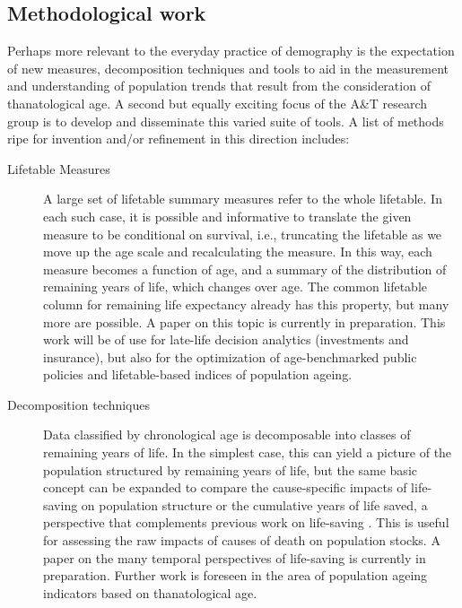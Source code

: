 \documentclass[a4paper,12pt]{article}
\begin{document}
\subsection{Methodological work}
Perhaps more relevant to the everyday practice of demography is the expectation
of new measures, decomposition techniques and tools to aid in the measurement
and understanding of population trends that result from the consideration of
thanatological age. A second but equally exciting focus of the A\&T research
group is to develop and disseminate this varied suite of tools. A list of
methods ripe for invention and/or refinement in this direction includes:

\begin{description}
\item[Lifetable Measures]{A large set of lifetable summary measures refer to
the whole lifetable. In each such case, it is possible and
informative to translate the given measure to be conditional on survival, i.e.,
truncating the lifetable as we move up the age scale and recalculating the
measure. In this way, each measure becomes a function of age, and a summary of
the distribution of remaining years of life, which changes over age. The common
lifetable column for remaining life expectancy already has this property, but
many more are possible. A paper on this topic is currently in preparation.
This work will be of use for late-life decision analytics (investments and
insurance), but also for the optimization of age-benchmarked public policies
and lifetable-based indices of population ageing.}
\item[Decomposition techniques]{Data classified by chronological age is
decomposable into classes of remaining years of life. In the simplest case,
this can yield a picture of the population structured by remaining years of life, but
the same basic concept can be expanded to compare the cause-specific impacts of
life-saving on population structure or the cumulative
years of life saved, a perspective that complements previous work on life-saving
\cite{vaupel1987repeated,vaupel2008lifesaving}. This is useful for
assessing the raw impacts of causes of death on population stocks. A paper on
the many temporal perspectives of life-saving is currently in
preparation. Further work is foreseen in the area of population ageing
indicators based on thanatological age.}
\end{description}
\end{document}
